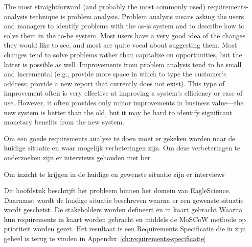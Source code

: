 The most straightforward (and probably the most commonly used) requirements-analysis technique is problem analysis. Problem analysis means asking the users and managers to identify problems with the as-is system and to describe how to solve them in the to-be system. Most users have a very good idea of the changes they would like to see, and most are quite vocal about suggesting them. Most changes tend to solve problems rather than capitalize on opportunities, but the latter is possible as well. Improvements from problem analysis tend to be small and incremental (e.g., provide more space in which to type the customer’s address; provide a new report that currently does not exist).
This type of improvement often is very effective at improving a system’s efficiency or ease of use. However, it often provides only minor improvements in business value—the new system is better than the old, but it may be hard to identify significant monetary benefits from the new system.







Om een goede requirements analyse te doen moet er gekeken worden naar de huidige situatie en waar mogelijk verbeteringen zijn. Om deze verbeteringen te onderzoeken zijn er interviews gehouden met ber






Om inzicht te krijgen in de huidige en gewenste situatie zijn er interviews


Dit hoofdstuk beschrijft het probleem binnen het domein van EagleScience. Daarnaast wordt de huidige situatie beschreven waarna er een gewenste situatie wordt geschetst. De stakeholders worden defineert en in kaart gebracht Waarna hun requirements in kaart worden gebracht en middels de MoSCoW methode op prioriteit worden gezet. Het resultaat is een Requirements Specificatie die in zijn geheel is terug te vinden in Appendix~\ref{ch:requirements-specificatie}


